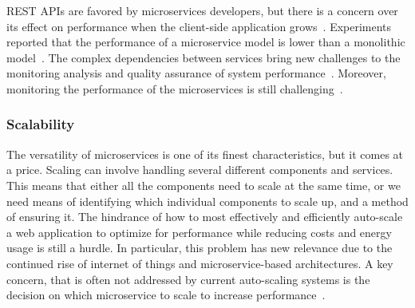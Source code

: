 REST APIs are favored by microservices developers, but there is a concern over its effect on performance when the client-side application grows~\cite{Ghebremicael2017}. Experiments reported that the performance of a microservice model is lower than a monolithic model~\cite{Johansson2019}. The complex dependencies between services bring new challenges to the monitoring analysis and quality assurance of system performance~\cite{Zhihui2020}. Moreover, monitoring the performance of the microservices is still challenging~\cite{Saman2017, Venugopal2017}.



\subsubsection{Scalability}%

The versatility of microservices is one of its finest characteristics, but it comes at a price. Scaling can involve handling several different components and services. This means that either all the components need to scale at the same time, or we need means of identifying which individual components to scale up, and a method of ensuring it\cite{Meshenberg2016}.
%
The hindrance of how to most effectively and efficiently auto-scale a web application to optimize for performance while reducing costs and energy usage is still a hurdle. In particular, this problem has new relevance due to the continued rise of internet of things and microservice-based architectures. A key concern, that is often not addressed by current auto-scaling systems is the decision on which microservice to scale to increase performance~\cite{coulson2020}.

